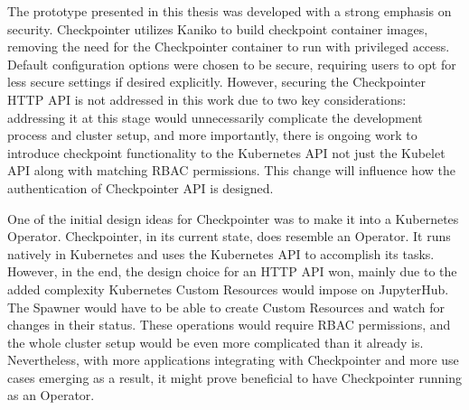 \documentclass[
  digital,     %
  oneside,     %
  nosansbold,  %
  nocolorbold, %
  lof,         %
  nolot,         %
]{fithesis4}
\begin{document}
The prototype presented in this thesis was developed with a strong emphasis on security. Checkpointer utilizes Kaniko to build checkpoint container images, removing the need for the Checkpointer container to run with privileged access. Default configuration options were chosen to be secure, requiring users to opt for less secure settings if desired explicitly. However, securing the Checkpointer HTTP API is not addressed in this work due to two key considerations: addressing it at this stage would unnecessarily complicate the development process and cluster setup, and more importantly, there is ongoing work to introduce checkpoint functionality to the Kubernetes API not just the Kubelet API along with matching RBAC permissions. This change will influence how the authentication of Checkpointer API is designed.




One of the initial design ideas for Checkpointer was to make it into a Kubernetes Operator. Checkpointer, in its current state, does resemble an Operator. It runs natively in Kubernetes and uses the Kubernetes API to accomplish its tasks. However, in the end, the design choice for an HTTP API won, mainly due to the added complexity Kubernetes Custom Resources would impose on JupyterHub. The Spawner would have to be able to create Custom Resources and watch for changes in their status. These operations would require RBAC permissions, and the whole cluster setup would be even more complicated than it already is. Nevertheless, with more applications integrating with Checkpointer and more use cases emerging as a result, it might prove beneficial to have Checkpointer running as an Operator.
\end{document}

